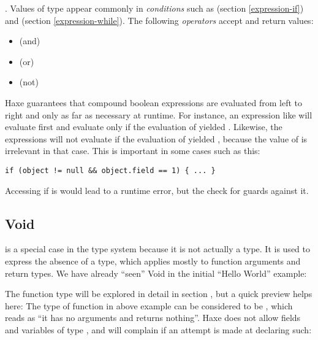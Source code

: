 \documentclass{haxe}
\begin{document}
.
Values of type  appear commonly in \emph{conditions} such as  (section \ref{expression-if}) and  (section \ref{expression-while}). The following \emph{operators} accept and return  values:
\begin{itemize}
	\item \expr{\&\&} (and)
	\item \expr{||} (or)
	\item \expr{!} (not)
\end{itemize}
Haxe guarantees that compound boolean expressions are evaluated from left to right and only as far as necessary at runtime. For instance, an expression like  will evaluate  first and evaluate  only if the evaluation of  yielded . Likewise, the expressions  will not evaluate  if the evaluation of  yielded , because the value of  is irrelevant in that case.
This is important in some cases such as this:

\begin{lstlisting}
if (object != null && object.field == 1) { ... }
\end{lstlisting}
Accessing  if  is  would lead to a runtime error, but the check for  guards against it.




\subsection{Void}
\label{types-void}


 is a special case in the type system because it is not actually a type. It is used to express the absence of a type, which applies mostly to function arguments and return types.
We have already ``seen'' Void in the initial ``Hello World'' example:

The function type will be explored in detail in section , but a quick preview helps here: The type of function  in above example can be considered to be , which reads as ``it has no arguments and returns nothing''.
Haxe does not allow fields and variables of type , and will complain if an attempt is made at declaring such:
\end{document}

